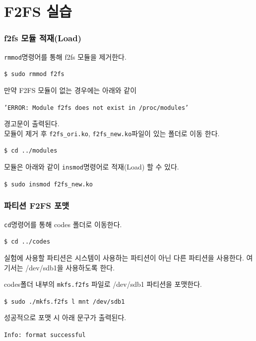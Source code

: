 \documentclass[newPxFont,sthlmFooter,nooffset]{beamer}
\begin{document}
\section{F2FS 실습}
\begin{frame}[containsverbatim,t]
  \frametitle{f2fs 모듈 적재(Load)}
\texttt{rmmod}명령어를 통해 f2fs 모듈을 제거한다.
\begin{mdframed}[backgroundcolor=lightgray,hidealllines=true]
\texttt{\textcolor[rgb]{0,0,0}{\$ sudo rmmod f2fs}}
\end{mdframed}
\bigskip
만약 F2FS 모듈이 없는 경우에는 아래와 같이
\begin{mdframed}[backgroundcolor=lightgray,hidealllines=true]
\texttt{\textcolor[rgb]{0,0,0}{'ERROR: Module f2fs does not exist in /proc/modules'}}
\end{mdframed}
\bigskip
경고문이 출력된다.\\ 
모듈이 제거 후 \texttt{f2fs\_ori.ko}, \texttt{f2fs\_new.ko}파일이 있는 폴더로 이동 한다.
\begin{mdframed}[backgroundcolor=lightgray,hidealllines=true]
\texttt{\textcolor[rgb]{0,0,0}{\$ cd ../modules}}
\end{mdframed}
\bigskip
모듈은 아래와 같이 \texttt{insmod}명령어로 적재(Load) 할 수 있다.
\begin{mdframed}[backgroundcolor=lightgray,hidealllines=true]
\texttt{\textcolor[rgb]{0,0,0}{\$ sudo insmod f2fs\_new.ko}}
\end{mdframed}
\bigskip
\end{frame}

\begin{frame}[containsverbatim,t]
  \frametitle{파티션 F2FS 포맷}
\texttt{cd}명령어를 통해 codes 폴더로 이동한다.
\begin{mdframed}[backgroundcolor=lightgray,hidealllines=true]
\texttt{\textcolor[rgb]{0,0,0}{\$ cd ../codes}}
\end{mdframed}
\bigskip
실험에 사용할 파티션은 시스템이 사용하는 파티션이 아닌 다른 파티션을 사용한다. 여기서는 /dev/sdb1을 사용하도록 한다. 

codes폴더 내부의 \texttt{mkfs.f2fs} 파일로 /dev/sdb1 파티션을 포맷한다.
\begin{mdframed}[backgroundcolor=lightgray,hidealllines=true]
\texttt{\textcolor[rgb]{0,0,0}{\$ sudo ./mkfs.f2fs \-l mnt /dev/sdb1}}
\end{mdframed}
\bigskip
성공적으로 포맷 시 아래 문구가 출력된다.
\begin{mdframed}[backgroundcolor=lightgray,hidealllines=true]
\texttt{\textcolor[rgb]{0,0,0}{Info: format successful}}
\end{mdframed}
\bigskip
\end{frame}
\end{document}
